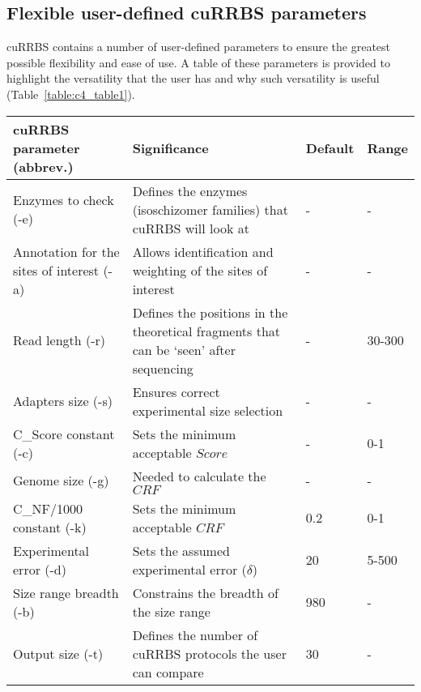 \subsection*{Flexible user-defined cuRRBS parameters}

cuRRBS contains a number of user-defined parameters to ensure the greatest possible flexibility and ease of use. A table of these parameters is provided to highlight the versatility that the user has and why such versatility is useful (Table~\ref{table:c4_table1}).

\begin{table}
	\small
	\begin{tabular}{ p{5cm} p{6.5cm} p{1cm} p{1.5cm} }
		\toprule
		\textbf{cuRRBS parameter (abbrev.)} & \textbf{Significance} & \textbf{Default} & \textbf{Range} \\ 
		\midrule
		Enzymes to check (-e) &  Defines the enzymes (isoschizomer families) that cuRRBS will look at & -  & -  \\
		
		Annotation for the sites of interest (-a) & Allows identification and weighting of the sites of interest & - & - \\
		
		Read length (-r) & Defines the positions in the theoretical fragments that can be `seen' after sequencing & - & 30-300 \\
		
		Adapters size (-s) & Ensures correct experimental size selection & - & - \\
		
		C\_Score constant (-c) & Sets the minimum acceptable $Score$ & - & 0-1  \\
		
		Genome size (-g) & Needed to calculate the $CRF$ & - & - \\
		
		C\_NF/1000 constant (-k) & Sets the minimum acceptable $CRF$ & 0.2 & 0-1 \\
		
		Experimental error (-d) & Sets the assumed experimental error ($\delta$) & 20 & 5-500  \\
		
		Size range breadth (-b) & Constrains the breadth of the size range & 980 & - \\
		
		Output size (-t) & Defines the number of cuRRBS protocols the user can compare & 30 & - \\
		

\end{tabular}
\end{table}
